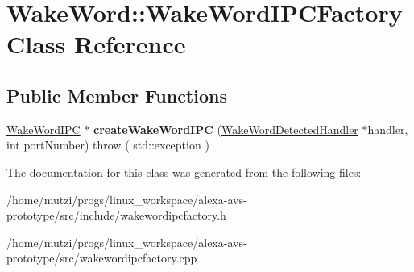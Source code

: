 \hypertarget{classWakeWord_1_1WakeWordIPCFactory}{}\section{Wake\+Word\+:\+:Wake\+Word\+I\+P\+C\+Factory Class Reference}
\label{classWakeWord_1_1WakeWordIPCFactory}
\subsection*{Public Member Functions}
\begin{DoxyCompactItemize}
\item 
\mbox{\label{classWakeWord_1_1WakeWordIPCFactory_a6e0d90802615e58d1001b3d18cdfcc5a}} 
\hyperlink{classWakeWord_1_1WakeWordIPC}{Wake\+Word\+I\+PC} $\ast$ {\bfseries create\+Wake\+Word\+I\+PC} (\hyperlink{classWakeWord_1_1WakeWordDetectedHandler}{Wake\+Word\+Detected\+Handler} $\ast$handler, int port\+Number)  throw ( std\+::exception )
\end{DoxyCompactItemize}


The documentation for this class was generated from the following files\+:\begin{DoxyCompactItemize}
\item 
/home/mutzi/progs/linux\+\_\+workspace/alexa-\/avs-\/prototype/src/include/wakewordipcfactory.\+h\item 
/home/mutzi/progs/linux\+\_\+workspace/alexa-\/avs-\/prototype/src/wakewordipcfactory.\+cpp\end{DoxyCompactItemize}

